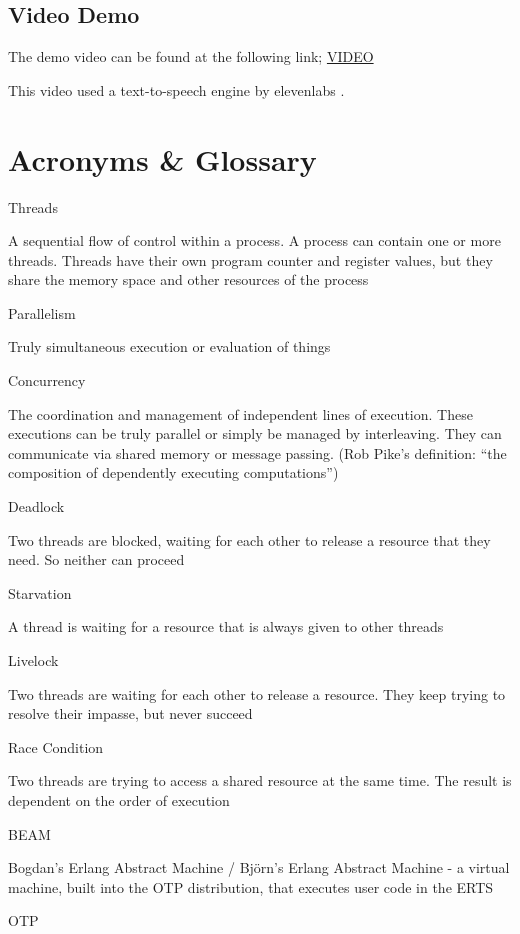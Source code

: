 \documentclass[]{interim}
\begin{document}
\section{Video Demo}

The demo video can be found at the following link; \href{https://youtu.be/jvWuQHjNPdc}{VIDEO}

This video used a text-to-speech engine by elevenlabs \cite{noauthor_ai_nodate}.

\chapter{Acronyms \& Glossary}

Threads

A sequential flow of control within a process. A process can contain one or more threads.
Threads have their own program counter and register values, but they share the memory space
and other resources of the process

Parallelism

Truly simultaneous execution or evaluation of things

Concurrency

The coordination and management of independent lines of execution. These executions
can be truly parallel or simply be managed by interleaving. They can communicate
via shared memory or message passing. (Rob Pike's definition: “the composition of
dependently executing computations”)

Deadlock

Two threads are blocked, waiting for each other to release a resource that they need. So neither can proceed

Starvation

A thread is waiting for a resource that is always given to other threads

Livelock

Two threads are waiting for each other to release a resource. They keep trying to resolve their impasse, but never succeed

Race Condition

Two threads are trying to access a shared resource at the same time. The result is dependent on the order of execution

BEAM

Bogdan's Erlang Abstract Machine / Björn's Erlang Abstract Machine - a virtual machine, built into the OTP
distribution, that executes user code in the ERTS

OTP
\end{document}
